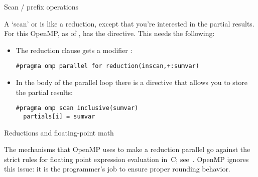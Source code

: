 
 {Scan / prefix operations}

A `scan' or 
is like a reduction, except that you're interested
in the partial results.
For this OpenMP, as of , has the  directive.
This needs the following:
\begin{itemize}
\item The reduction clause gets a modifier :
\begin{lstlisting}
#pragma omp parallel for reduction(inscan,+:sumvar)
\end{lstlisting}
\item In the body of the parallel loop there is a  directive
  that allows you to store the partial results:
\begin{lstlisting}
#pragma omp scan inclusive(sumvar)
  partials[i] = sumvar
\end{lstlisting}
\end{itemize}


 {Reductions and floating-point math}

The mechanisms that OpenMP uses to make a reduction parallel go
against the strict rules for floating point expression evaluation in~C;
see~. OpenMP ignores this issue: it is the
programmer's job to ensure proper rounding behavior.


\endinput

\begin{verbatim}
================ #threads = 1 ================
               Sequential: 1.761771e+01; total force: 7.552465e+08
       Full loop Parallel: 3.251586e+00; total force: 7.552465e+08, speedup= 5.42
 Triangular update atomic: 1.787765e+01; total force: 7.552465e+08, speedup= 0.99
         Full loop atomic: 2.001587e+01; total force: 7.552465e+08, speedup= 0.88
================ #threads = 18 ================
               Sequential: 1.764474e+01; total force: 7.426427e+08
       Full loop Parallel: 1.820593e+00; total force: 7.426427e+08, speedup= 9.69
 Triangular update atomic: 2.513533e+00; total force: 7.426427e+08, speedup= 7.02
         Full loop atomic: 1.117391e+00; total force: 7.426427e+08, speedup=15.79
================ #threads = 37 ================
               Sequential: 1.764488e+01; total force: 7.383082e+08
       Full loop Parallel: 4.445617e+00; total force: 7.383082e+08, speedup= 3.97
 Triangular update atomic: 1.560774e+00; total force: 7.383082e+08, speedup=11.31
         Full loop atomic: 5.465267e-01; total force: 7.383082e+08, speedup=32.29
================ #threads = 56 ================
               Sequential: 1.764368e+01; total force: 7.420574e+08
       Full loop Parallel: 8.536602e+00; total force: 7.420574e+08, speedup= 2.07
 Triangular update atomic: 1.221944e+00; total force: 7.420574e+08, speedup=14.44
         Full loop atomic: 3.623484e-01; total force: 7.420574e+08, speedup=48.69
\end{verbatim}

